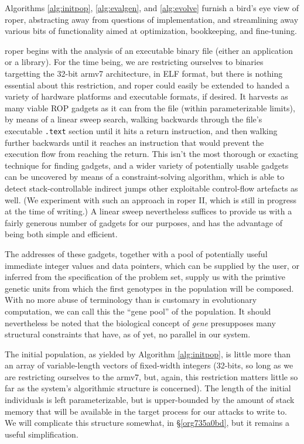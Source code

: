 \documentclass[12pt,glossary]{dalthesis}
\begin{document}
Algorithms \ref{alg:initpop}, \ref{alg:evalgen}, and \ref{alg:evolve}
furnish a bird's eye view of \gls{roper}, abstracting away from questions of
implementation, and streamlining away various bits of functionality
aimed at optimization, bookkeeping, and fine-tuning.

\gls{roper} begins with the analysis of an executable binary file (either an
application or a library). For the time being, we are restricting
ourselves to binaries targetting the 32-bit \gls{armv7} architecture, in ELF
format, but there is nothing essential about this restriction, and
\gls{roper} could easily be extended to handed a variety of hardware
platforms and executable formats, if desired. It harvests as many viable
ROP gadgets as it can from the file (within parameterizable limits), by 
means of a linear sweep search, walking backwards through the file's
executable \texttt{.text} section until it hits a return instruction, and then
walking further backwards until it reaches an instruction that would
prevent the execution flow from reaching the return. This isn't the
most thorough or exacting technique for finding gadgets, and a wider
variety of potentially usable gadgets can be uncovered by means of
a constraint-solving algorithm, which is able to detect stack-controllable
indirect jumps other exploitable control-flow artefacts as well. (We experiment
with such an approach in \gls{roper} II, which is still in progress at the time of
writing.) A linear sweep nevertheless suffices to provide us with a fairly
generous number of gadgets for our purposes, and has the advantage of being
both simple and efficient.

The addresses of these gadgets, together with a pool of potentially useful
immediate integer values and data pointers, which can be supplied by the
user, or inferred from the specification of the problem set, supply us with
the primtive genetic units from which the first genotypes in the population will
be composed. With no more abuse of terminology than is customary in evolutionary
computation, we can call this the ``gene pool'' of the population. It should
nevertheless be noted that the biological concept of \emph{gene} presupposes many
structural constraints that have, as of yet, no parallel in our system.

The initial population, as yielded by Algorithm \ref{alg:initpop}, is
little more than an array of variable-length vectors of fixed-width
integers (32-bits, so long as we are restricting ourselves to the
\gls{armv7}, but, again, this restriction matters little so far as the
system's algorithmic structure is concerned). The length of the
initial individuals is left parameterizable, but is upper-bounded by
the amount of stack memory that will be available in the target
process for our attacks to write to. We will complicate this structure
somewhat, in \S \ref{org735a0bd}, but it remains a useful
simplification.
\end{document}
